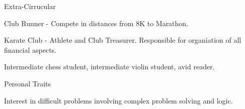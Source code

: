 \documentclass{resume} %
\begin{document}
\begin{rSection}{Extra-Cirrucular} \itemsep -3pt
	\item Club Runner - Compete in distances from 8K to Marathon.
	\item Karate Club - Athlete and Club Treasurer. Responsible for organiation of all financial aspects.
	\item Intermediate chess student, intermediate violin student, avid reader.
\end{rSection}

\begin{rSection}{Personal Traits}
\item Interest in difficult problems involving complex problem solving and logic.
\end{rSection}
\end{document}
